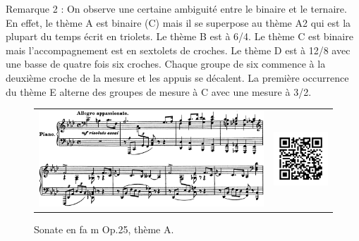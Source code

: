 Remarque 2 : On observe une certaine ambiguité entre le binaire et le ternaire. En effet, le thème A est binaire (C) mais il se superpose au thème A2 qui est la plupart du temps écrit en triolets. Le thème B est à 6/4. Le thème C est binaire mais l'accompagnement est en sextolets de croches. Le thème D est à 12/8 avec une basse de quatre fois six croches. Chaque groupe de six commence à la deuxième croche de la mesure et les appuis se décalent. La première occurrence du thème E alterne des groupes de mesure à C avec une mesure à 3/2.\\

\begin{figure}[!p]
  \begin{bigcenter}
    \begin{tabular}{lr}
      \includegraphics[width=12.5cm, keepaspectratio]{sonate-theme-A.png}
      &
      \includegraphics[width=3cm, keepaspectratio]{op1-qr.png}
    \end{tabular}
  \end{bigcenter}
  \caption{\label{sonate-theme-1}Sonate en fa m Op.25, thème A.}
\end{figure}

